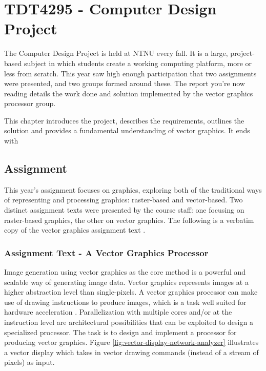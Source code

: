 \chapter{TDT4295 - Computer Design Project}
\label{sec:intro}

The Computer Design Project is held at NTNU every fall.
It is a large, project-based subject in which students create a working computing platform, more or less from scratch.
This year saw high enough participation that two assignments were presented, and two groups formed around these.
The report you're now reading details the work done and solution implemented by the vector graphics processor group.

This chapter introduces the project, describes the requirements, outlines the solution and provides a fundamental understanding of vector graphics. It ends with 

\section{Assignment}

This year's assignment focuses on graphics, exploring both of the traditional ways of representing and processing graphics: raster-based and vector-based.
Two distinct assignment texts were presented by the course staff: one focusing on raster-based graphics, the other on vector graphics.
The following is a verbatim copy of the vector graphics assignment text \cite{assignment-text}.

\subsection{Assignment Text - A Vector Graphics Processor}

Image generation using vector graphics as the core method is a powerful and scalable way of generating image data.
Vector graphics represents images at a higher abstraction level than single-pixels.
A vector graphics processor can make use of drawing instructions to produce images, which is a task well suited for hardware acceleration \cite{openvg}.
Parallelization with multiple cores and/or at the instruction level are architectural possibilities that can be exploited to design a specialized processor.
The task is to design and implement a processor for producing vector graphics.
Figure \ref{fig:vector-display-network-analyzer} illustrates a vector display which takes in vector drawing commands (instead of a stream of pixels) as input.

